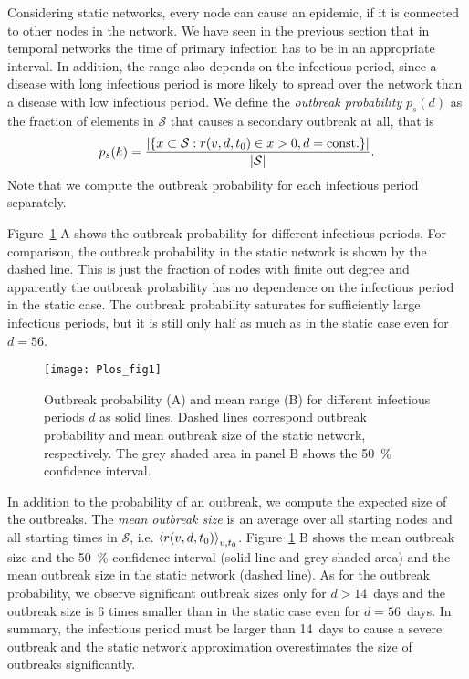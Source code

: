 Considering static networks, every node can cause an epidemic, if it is connected to other nodes in the network.
We have seen in the previous section that in temporal networks the time of primary infection has to be in an appropriate interval.
In addition, the range also depends on the infectious period, since a disease with long infectious period is more likely to spread over the network than a disease with low infectious period.
We define the \emph{outbreak probability} $p_s(d)$ as the fraction of elements in $\mathcal{S}$ that causes a secondary outbreak at all, that is
\begin{equation}\label{eq:outbreak_prob}
p_s(k)=\frac{\left| \left\{ x \subset \mathcal{S}: r(v,d,t_0) \in x >0, d=\mathrm{const.} \right\} \right|}{\left| \mathcal{S} \right|} .
\end{equation}
Note that we compute the outbreak probability for each infectious period separately.

Figure~\ref{fig:plosfig1} A shows the outbreak probability for different infectious periods.
For comparison, the outbreak probability in the static network is shown by the dashed line.
This is just the fraction of nodes with finite out degree and apparently the outbreak probability has no dependence on the infectious period in the static case.
The outbreak probability saturates for sufficiently large infectious periods, but it is still only half as much as in the static case even for $d=56$.
%
\begin{figure}[htb]
\begin{center}
\texttt{[image: Plos\_fig1]}
\caption{Outbreak probability (A) and mean range (B) for different infectious periods $d$ as solid lines.
Dashed lines correspond outbreak probability and mean outbreak size of the static network, respectively.
The grey shaded area in panel B shows the 50~\% confidence interval.}
\label{fig:plosfig1}
\end{center}
\end{figure}

In addition to the probability of an outbreak, we compute the expected size of the outbreaks.
The \emph{mean outbreak size} is an average over all starting nodes and all starting times in $\mathcal{S}$, i.e. $\left< r(v,d,t_0) \right>_{v,t_0}$.
Figure~\ref{fig:plosfig1} B shows the mean outbreak size and the 50~\% confidence interval (solid line and grey shaded area) and the mean outbreak size in the static network (dashed line).
As for the outbreak probability, we observe significant outbreak sizes only for $d>14$~days and the outbreak size is 6 times smaller than in the static case even for $d=56$~days.
In summary, the infectious period must be larger than 14~days to cause a severe outbreak and the static network approximation overestimates the size of outbreaks significantly.

